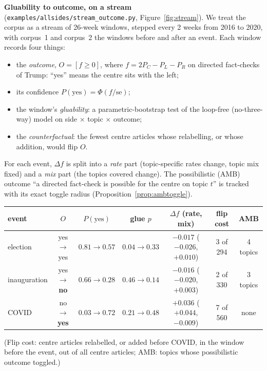 \documentclass[11pt]{article}
\theoremstyle{definition}
\theoremstyle{remark}
\begin{document}
\textbf{Gluability to outcome, on a stream} (\texttt{examples/allsides/stream\_outcome.py}, Figure~\ref{fig:stream}). We treat the corpus as a stream of 26-week windows, stepped every 2 weeks from 2016 to 2020, with corpus~1 and corpus~2 the windows before and after an event. Each window records four things:
\begin{itemize}
  \item the \emph{outcome}, $O=[f\ge0]$, where $f=2P_C-P_L-P_R$ on directed fact-checks of Trump: ``yes'' means the centre sits with the left;
  \item its confidence $P(\text{yes})=\Phi(f/\mathrm{se})$;
  \item the window's \emph{gluability}: a parametric-bootstrap test of the loop-free (no-three-way) model on side $\times$ topic $\times$ outcome;
  \item the \emph{counterfactual}: the fewest centre articles whose relabelling, or whose addition, would flip $O$.
\end{itemize}
For each event, $\Delta f$ is split into a \emph{rate} part (topic-specific rates change, topic mix fixed) and a \emph{mix} part (the topics covered change). The possibilistic (AMB) outcome ``a directed fact-check is possible for the centre on topic $t$'' is tracked with its exact toggle radius (Proposition~\ref{prop:ambtoggle}).
\begin{center}\small
\setlength{\tabcolsep}{3pt}
\begin{tabular}{lcccccc}
\toprule
event & $O$ & $P(\text{yes})$ & glue $p$ & $\Delta f$ (rate, mix) & flip cost & AMB\\
\midrule
election & yes$\to$yes & $0.81\to0.57$ & $0.04\to0.33$ & $-0.017$ ($-0.026$, $+0.010$) & 3 of 294 & 4 topics\\
inauguration & yes$\to$\textbf{no} & $0.66\to0.28$ & $0.46\to0.14$ & $-0.016$ ($-0.020$, $+0.003$) & 2 of 330 & 3 topics\\
COVID & no$\to$\textbf{yes} & $0.03\to0.72$ & $0.21\to0.48$ & $+0.036$ ($+0.044$, $-0.009$) & 7 of 560 & none\\
\bottomrule
\end{tabular}
\end{center}
\noindent (Flip cost: centre articles relabelled, or added before COVID, in the window before the event, out of all centre articles; AMB: topics whose possibilistic outcome toggled.)
\end{document}
